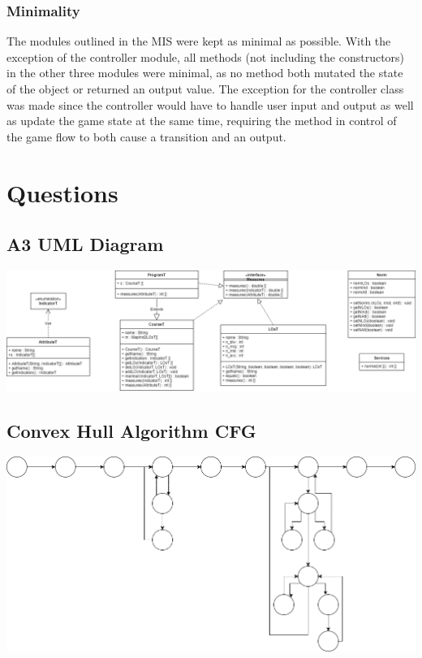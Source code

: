\documentclass[12pt]{article}
\begin{document}
\subsubsection*{Minimality}
The modules outlined in the MIS were kept as minimal as possible. With the exception of the controller module, all methods (not including the constructors) in the other three modules were minimal, as no method both mutated the state of the object or returned an output value. The exception for the controller class was made since the controller would have to handle user input and output as well as update the game state at the same time, requiring the method in control of the game flow to both cause a transition and an output.

\newpage

\section*{Questions}
\subsection*{A3 UML Diagram}
\includegraphics[scale=0.4]{UMLdiagram2.png}

\newpage
\subsection*{Convex Hull Algorithm CFG}
\includegraphics[scale=0.5]{CFG.png}
\end{document}
